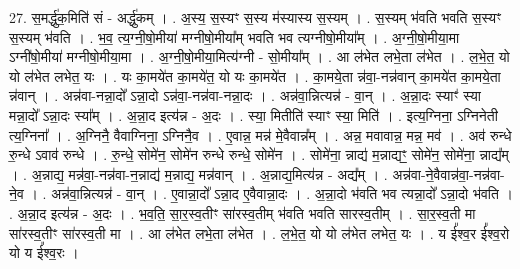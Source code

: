 \documentclass[17pt]{extarticle}
\begin{document}
27. स॒मर्द्धु॑क॒मिति॑ सं - अर्द्धु॑कम् । . अ॒स्य॒ स॒स्यꣳ स॒स्य म॑स्यास्य स॒स्यम् । . स॒स्यम् भ॑वति भवति स॒स्यꣳ स॒स्यम् भ॑वति । . भ॒व॒ त्य॒ग्नी॒षो॒मीया॑ मग्नीषो॒मीया᳚म् भवति भव त्यग्नीषो॒मीया᳚म् । . अ॒ग्नी॒षो॒मीया॒मा ऽग्नी॑षो॒मीया॑ मग्नीषो॒मीया॒मा । . अ॒ग्नी॒षो॒मीया॒मित्य॑ग्नी - सो॒मीया᳚म् । . आ ल॑भेत लभे॒ता ल॑भेत । . ल॒भे॒त॒ यो यो ल॑भेत लभेत॒ यः । . यः का॒मये॑त का॒मये॑त॒ यो यः का॒मये॑त । . का॒मये॒ता न्न॑वा॒-नन्न॑वान् का॒मये॑त का॒मये॒ता न्न॑वान् । . अन्न॑वा-नन्ना॒दो᳚ ऽन्ना॒दो ऽन्न॑वा॒-नन्न॑वा-नन्ना॒दः । . अन्न॑वा॒न्नित्यन्न॑ - वा॒न् । . अ॒न्ना॒दः स्याꣳ॑ स्या मन्ना॒दो᳚ ऽन्ना॒दः स्या᳚म् । . अ॒न्ना॒द इत्य॑न्न - अ॒दः । . स्या॒ मितीति॑ स्याꣳ स्या॒ मिति॑ । . इत्य॒ग्निना॒ ऽग्निनेती त्य॒ग्निना᳚ । . अ॒ग्निनै॒ वैवाग्निना॒ ऽग्निनै॒व । . ए॒वान्न॒ मन्न॑ मे॒वैवान्न᳚म् । . अन्न॒ मवावान्न॒ मन्न॒ मव॑ । . अव॑ रुन्धे रु॒न्धे ऽवाव॑ रुन्धे । . रु॒न्धे॒ सोमे॑न॒ सोमे॑न रुन्धे रुन्धे॒ सोमे॑न । . सोमे॑ना॒ न्नाद्य॑ म॒न्नाद्यꣳ॒॒ सोमे॑न॒ सोमे॑ना॒ न्नाद्य᳚म् । . अ॒न्नाद्य॒ मन्न॑वा॒-नन्न॑वा-न॒न्नाद्य॑ म॒न्नाद्य॒ मन्न॑वान् । . अ॒न्नाद्य॒मित्य॑न्न - अद्य᳚म् । . अन्न॑वा-ने॒वैवान्न॑वा॒-नन्न॑वा-ने॒व । . अन्न॑वा॒न्नित्यन्न॑ - वा॒न् । . ए॒वान्ना॒दो᳚ ऽन्ना॒द ए॒वैवान्ना॒दः । . अ॒न्ना॒दो भ॑वति भव त्यन्ना॒दो᳚ ऽन्ना॒दो भ॑वति । . अ॒न्ना॒द इत्य॑न्न - अ॒दः । . भ॒व॒ति॒ सा॒र॒स्व॒तीꣳ सा॑रस्व॒तीम् भ॑वति भवति सारस्व॒तीम् । . सा॒र॒स्व॒ती मा सा॑रस्व॒तीꣳ सा॑रस्व॒ती मा । . आ ल॑भेत लभे॒ता ल॑भेत । . ल॒भे॒त॒ यो यो ल॑भेत लभेत॒ यः । . य ई᳚श्व॒र ई᳚श्व॒रो यो य ई᳚श्व॒रः । \newline
\end{document}
